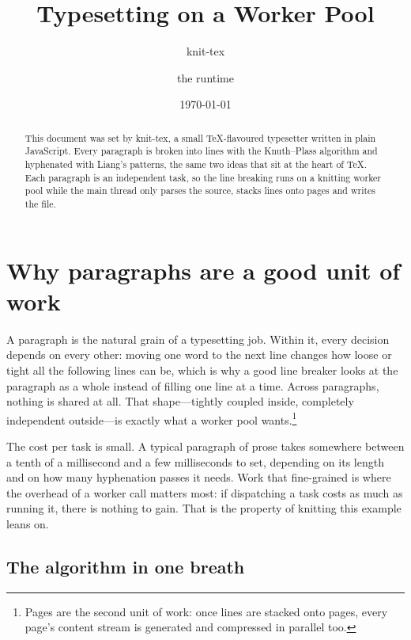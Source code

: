 \documentclass[10pt]{article}
\title{Typesetting on a Worker Pool}
\author{knit-tex \and the \knit{} runtime}
\date{\today}
\newcommand{\knit}{\textsf{knitting}}
\begin{document}
\maketitle

\begin{abstract}
This document was set by knit-tex, a small TeX-flavoured typesetter written in
plain JavaScript. Every paragraph is broken into lines with the Knuth--Plass
algorithm and hyphenated with Liang's patterns, the same two ideas that sit at
the heart of \TeX. Each paragraph is an independent task, so the line breaking
runs on a \knit{} worker pool while the main thread only parses the source,
stacks lines onto pages and writes the file.
\end{abstract}

\section{Why paragraphs are a good unit of work}
\label{sec:why}

A paragraph is the natural grain of a typesetting job. Within it, every
decision depends on every other: moving one word to the next line changes how
loose or tight all the following lines can be, which is why a good line
breaker looks at the paragraph as a whole instead of filling one line at a
time. Across paragraphs, nothing is shared at all. That shape---tightly
coupled inside, completely independent outside---is exactly what a worker pool
wants.\footnote{Pages are the second unit of work: once lines are stacked onto
pages, every page's content stream is generated and compressed in parallel too.}

The cost per task is small. A typical paragraph of prose takes somewhere
between a tenth of a millisecond and a few milliseconds to set, depending on
its length and on how many hyphenation passes it needs. Work that fine-grained
is where the overhead of a worker call matters most: if dispatching a task
costs as much as running it, there is nothing to gain. That is the property of
\knit{} this example leans on.

\subsection{The algorithm in one breath}
\end{document}
